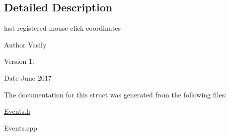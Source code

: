 \subsection{Detailed Description}
last registered mouse click coordinates 

\begin{DoxyAuthor}{Author}
Vasily 
\end{DoxyAuthor}
\begin{DoxyVersion}{Version}
1. 
\end{DoxyVersion}
\begin{DoxyDate}{Date}
June 2017 
\end{DoxyDate}


The documentation for this struct was generated from the following files\+:\begin{DoxyCompactItemize}
\item 
\hyperlink{_events_8h}{Events.\+h}\item 
Events.\+cpp\end{DoxyCompactItemize}
